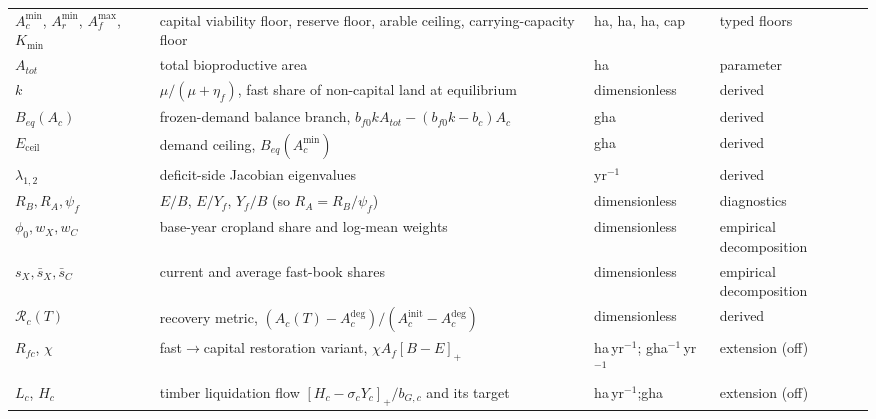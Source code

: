 \documentclass[11pt,a4paper]{article}
\newcommand{\pos}[1]{\left[#1\right]_+}
\newcommand{\Eceil}{E_{\mathrm{ceil}}}
\newcommand{\Acmin}{A_c^{\min}}
\begin{document}
\begin{longtable}{>{\raggedright\arraybackslash}p{}>{\raggedright\arraybackslash}p{}>{\raggedright\arraybackslash}p{}>{\raggedright\arraybackslash}p{}}
$\Acmin$, $A_r^{\min}$, $A_f^{\max}$, $K_{\min}$ & capital viability floor, reserve floor, arable ceiling, carrying-capacity floor & ha, ha, ha, cap & typed floors \\
$A_{tot}$ & total bioproductive area & ha & parameter \\
$k$ & $\mu/(\mu+\eta_f)$, fast share of non-capital land at equilibrium & dimensionless & derived \\
$B_{eq}(A_c)$ & frozen-demand balance branch, $b_{f0}kA_{tot}-(b_{f0}k-b_c)A_c$ & gha & derived \\
$\Eceil$ & demand ceiling, $B_{eq}(\Acmin)$ & gha & derived \\
$\lambda_{1,2}$ & deficit-side Jacobian eigenvalues & yr$^{-1}$ & derived \\
$R_B,R_A,\psi_f$ & $E/B$, $E/Y_f$, $Y_f/B$ (so $R_A=R_B/\psi_f$) & dimensionless & diagnostics \\
$\phi_0,w_X,w_C$ & base-year cropland share and log-mean weights & dimensionless & empirical decomposition \\
$s_X,\bar s_X,\bar s_C$ & current and average fast-book shares & dimensionless & empirical decomposition \\
$\mathcal R_c(T)$ & recovery metric, $(A_c(T)-A_c^{\mathrm{deg}})/(A_c^{\mathrm{init}}-A_c^{\mathrm{deg}})$ & dimensionless & derived \\
$R_{fc}$, $\chi$ & fast$\to$capital restoration variant, $\chi A_f\pos{B-E}$ & ha\,yr$^{-1}$; gha$^{-1}$\,yr$^{-1}$ & extension (off) \\
$L_c$, $H_c$ & timber liquidation flow $\pos{H_c-\sigma_cY_c}/b_{G,c}$ and its target & ha\,yr$^{-1}$;\newline gha & extension (off) \\
\bottomrule
\end{longtable}
\end{document}
